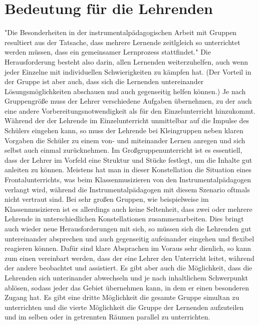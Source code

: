 \section{Bedeutung für die Lehrenden}

"Die Besonderheiten in der instrumentalpädagogischen Arbeit mit Gruppen
resultiert aus der Tatsache, dass mehrere Lernende zeitlgleich so unterrichtet
werden müssen, dass ein gemeinsamer Lernprozess stattfindet."
\autocite[221]{busch:grundwissen_instrumentalpaedagogik} Die Herausforderung
besteht also darin, allen Lernenden weiterzuhelfen, auch wenn jeder Einzelne mit
individuellen Schwierigkeiten zu kämpfen hat. (Der Vorteil in der Gruppe ist
aber auch, dass sich die Lernenden untereinander Lösungsmöglichkeiten abschauen
nud auch gegenseitig helfen können.) Je nach Gruppengröße muss der Lehrer
verschiedene Aufgaben übernehmen, zu der auch eine andere
Vorbereitungsnotwendigkeit als für den Einzelunterricht hinzukommt. Während der der Lehrende im
Einzelunterricht unmittelbar auf die Impulse des Schülers eingehen kann, so muss
der Lehrende bei Kleingruppen neben klaren Vorgaben die Schüler zu einem von-
und miteinander Lernen anregen und sich selbst auch einmal zurücknehmen. Im
Großgruppenunterricht ist es essentiell, dass der Lehrer im Vorfeld eine
Struktur und Stücke festlegt, um die Inhalte gut anleiten zu
können.\autocite[220]{busch:grundwissen_instrumentalpaedagogik} Meistens hat man
in dieser Konstellation die Situation eines Frontalunterrichts, was beim
Klassenmusizieren von den Instrumentalpädagogen verlangt wird, während die
Instrumentalpädagogen mit diesem Szenario oftmals nicht vertraut sind. Bei sehr
großen Gruppen, wie beispielweise im Klassenmusizieren ist es allerdings auch
keine Seltenheit, dass zwei oder mehrere Lehrende in unterschiedlichen
Konstellationen zusammenarbeiten. Dies bringt auch wieder neue Herausforderungen
mit sich, so müssen sich die Lehrenden gut untereinander absprechen und auch
gegenseitig aufeinander eingehen und flexibel reagieren können. Dafür sind klare
Absprachen im Voraus sehr dienlich, so kann zum einen vereinbart werden, dass
der eine Lehrer den Unterricht leitet, während der andere beobachtet und
assistiert. Es gibt aber auch die Möglichkeit, dass die Lehrenden sich
unterinander abwechseln und je nach inhaltlichem Schwerpunkt ablösen, sodass
jeder das Gebiet übernehmen kann, in dem er einen besonderen Zugang hat. Es gibt
eine dritte Möglichkeit die gesamte Gruppe simultan zu unterrichten und die
vierte Möglichkeit die Gruppe der Lernenden aufzuteilen und im selben oder in
getrennten Räumen parallel zu unterrichten. 

